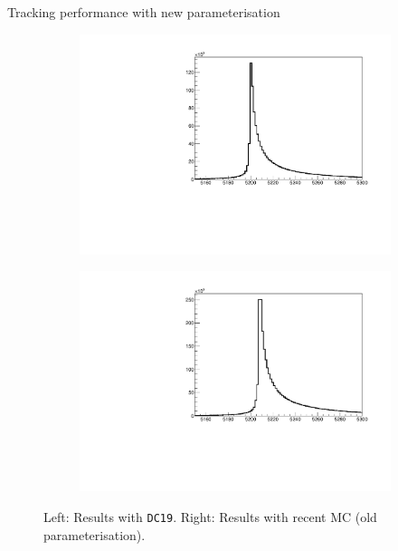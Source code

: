 \documentclass[xcolor={dvipsnames}]{beamer}
\begin{document}
\begin{frame}{Tracking performance with new parameterisation}
\begin{figure}[htb]
\begin{subfigure}{0.4\textwidth}
      \includegraphics[width=1\textwidth]{Plots/z_mag_distribution_old_parameterisation.pdf}
    \end{subfigure}%
    \begin{subfigure}{0.4\textwidth}
      \includegraphics[width=1\textwidth]{Plots/z_mag_distribution_new_parameterisation.pdf}
    \end{subfigure}
    \vspace{-0.3cm}
    \caption*{Left: Results with \texttt{DC19}. Right: Results with recent MC (old parameterisation).}
  \end{figure}
\end{frame}
\end{document}
